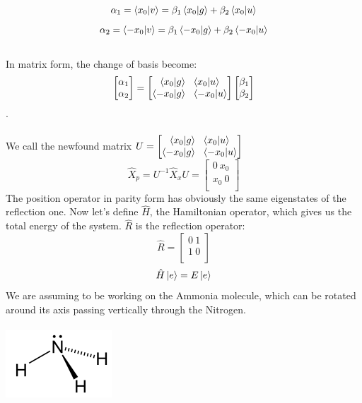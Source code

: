 \documentclass{article}
\begin{document}
$$ \alpha_1 =  \bra{x_0}\ket{v} = \beta_1 \bra{x_0}\ket{g} + \beta_2 \bra{x_0}\ket{u}$$
$$ \alpha_2 =  \bra{-x_0}\ket{v} = \beta_1 \bra{-x_0}\ket{g} + \beta_2 \bra{-x_0}\ket{u}$$\\
In matrix form, the change of basis become: \\
$$ \begin{bmatrix}
    \alpha_1 \\
    \alpha_2 \\ 
\end{bmatrix} = \begin{bmatrix}
    \bra{x_0}\ket{g} \ \ \bra{x_0}\ket{u} \\
    \bra{-x_0}\ket{g} \  \ \bra{-x_0}\ket{u} \\
\end{bmatrix} \begin{bmatrix}
    \beta_1 \\
    \beta_2 \\
\end{bmatrix}$$. \\ \\
We call the newfound matrix $U = \begin{bmatrix}
    \bra{x_0}\ket{g} \ \ \bra{x_0}\ket{u} \\
    \bra{-x_0}\ket{g} \  \ \bra{-x_0}\ket{u} \\
\end{bmatrix} $
$$\hat{X}_p = U^{-1} \hat{X}_x U = \begin{bmatrix}
    0 \ x_0 \\
    x_0 \ 0 \\
\end{bmatrix}$$ 
The position operator in parity form has obviously the same eigenstates of the reflection one.
Now let's define $\hat{H}$, the Hamiltonian operator, which gives us the total energy of the system.
$\hat{R}$ is the reflection operator:
$$\hat{R} = \begin{bmatrix}
    0 \ 1 \\
    1 \ 0 \\
\end{bmatrix}$$
$$\hat{H} \ket{e} = E \ket{e}$$
We are assuming to be working on the Ammonia molecule, which can be rotated around its axis passing vertically through the Nitrogen.\\ \\
\includegraphics[scale = 0.75]{ammonia.png} \\ \\
\end{document}
